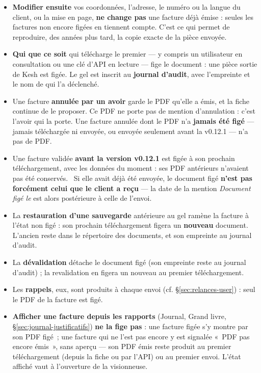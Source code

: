 \documentclass[a4paper,11pt,oneside]{article}
\begin{document}
\begin{itemize}
    \item \textbf{Modifier ensuite} vos coordonnées, l'adresse, le numéro ou la langue du client, ou la mise en page, \textbf{ne change pas} une facture déjà émise : seules les factures non encore figées en tiennent compte. C'est ce qui permet de reproduire, des années plus tard, la copie exacte de la pièce envoyée.
    \item \textbf{Qui que ce soit} qui télécharge le premier --- y compris un utilisateur en consultation ou une clé d'API en lecture --- fige le document : une pièce sortie de Kesh est figée. Le gel est inscrit au \textbf{journal d'audit}, avec l'empreinte et le nom de qui l'a déclenché.
    \item Une facture \textbf{annulée par un avoir} garde le PDF qu'elle a émis, et la fiche continue de le proposer. Ce PDF ne porte pas de mention d'annulation : c'est l'avoir qui la porte. Une facture annulée dont le PDF n'a \textbf{jamais été figé} --- jamais téléchargée ni envoyée, ou envoyée seulement avant la v0.12.1 --- n'a pas de PDF.
    \item Une facture validée \textbf{avant la version v0.12.1} est figée à son prochain téléchargement, avec les données du moment : ses PDF antérieurs n'avaient pas été conservés. \keshAttention\ Si elle avait déjà été envoyée, le document figé \textbf{n'est pas forcément celui que le client a reçu} --- la date de la mention \emph{Document figé le} est alors postérieure à celle de l'envoi.
    \item La \textbf{restauration d'une sauvegarde} antérieure au gel ramène la facture à l'état non figé : son prochain téléchargement figera un \textbf{nouveau} document. L'ancien reste dans le répertoire des documents, et son empreinte au journal d'audit.
    \item La \textbf{dévalidation} détache le document figé (son empreinte reste au journal d'audit) ; la revalidation en figera un nouveau au premier téléchargement.
    \item Les \textbf{rappels}, eux, sont produits à chaque envoi (cf. \S\ref{sec:relances-user}) : seul le PDF de la facture est figé.
    \item \textbf{Afficher une facture depuis les rapports} (Journal, Grand livre, \S\ref{sec:journal-justificatifs}) \textbf{ne la fige pas} : une facture figée s'y montre par son PDF figé~; une facture qui ne l'est pas encore y est signalée «~PDF pas encore émis~», sans aperçu --- son PDF émis reste produit au premier téléchargement (depuis la fiche ou par l'API) ou au premier envoi. L'état affiché vaut à l'ouverture de la visionneuse.
\end{itemize}
\end{document}
